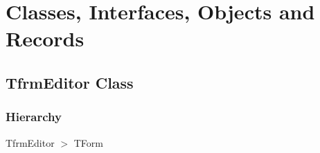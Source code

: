 \documentclass{report}
\newif\ifpdf
\begin{document}
\section{Classes, Interfaces, Objects and Records}
\ifpdf
\subsection*{\large{\textbf{TfrmEditor Class}}\normalsize\hspace{1ex}\hrulefill}
\else
\subsection*{TfrmEditor Class}
\fi
\label{editor.TfrmEditor}
\subsubsection*{\large{\textbf{Hierarchy}}\normalsize\hspace{1ex}\hfill}
TfrmEditor {$>$} TForm
\end{document}
